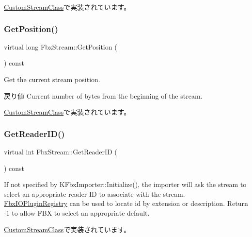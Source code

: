 \hyperlink{class_custom_stream_class_a127e5bdb249b98bf93fb50b3731747a6}{Custom\+Stream\+Class}で実装されています。

\mbox{\label{class_fbx_stream_aa63da9f62321748910acaa808322a794}} 
\subsubsection{\texorpdfstring{Get\+Position()}{GetPosition()}}
{\footnotesize\ttfamily virtual long Fbx\+Stream\+::\+Get\+Position (\begin{DoxyParamCaption}{ }\end{DoxyParamCaption}) const\hspace{0.3cm}{\ttfamily [pure virtual]}}

Get the current stream position. \begin{DoxyReturn}{戻り値}
Current number of bytes from the beginning of the stream. 
\end{DoxyReturn}


\hyperlink{class_custom_stream_class_ad8b406d43faa137290bf9527badeb27d}{Custom\+Stream\+Class}で実装されています。

\mbox{\label{class_fbx_stream_ae2a7513a648cde508d00f5172ba2843d}} 
\subsubsection{\texorpdfstring{Get\+Reader\+I\+D()}{GetReaderID()}}
{\footnotesize\ttfamily virtual int Fbx\+Stream\+::\+Get\+Reader\+ID (\begin{DoxyParamCaption}{ }\end{DoxyParamCaption}) const\hspace{0.3cm}{\ttfamily [pure virtual]}}

If not specified by K\+Fbx\+Importer\+::\+Initialize(), the importer will ask the stream to select an appropriate reader ID to associate with the stream. \hyperlink{class_fbx_i_o_plugin_registry}{Fbx\+I\+O\+Plugin\+Registry} can be used to locate id by extension or description. Return -\/1 to allow F\+BX to select an appropriate default. 

\hyperlink{class_custom_stream_class_a7587c69f5f569528a3084d3919fa21f9}{Custom\+Stream\+Class}で実装されています。

